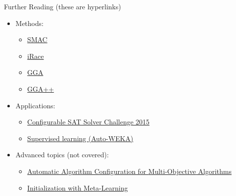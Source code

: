 \begin{frame}[c,fragile]{Further Reading (these are hyperlinks)}

\begin{itemize}
    \item Methods:
    \begin{itemize}
        \item \href{http://aad.informatik.uni-freiburg.de/papers/11-LION5-SMAC.pdf}{\alert{SMAC}}
        \item \href{http://www.sciencedirect.com/science/article/pii/S2214716015300270}{\alert{iRace}}
        \item \href{http://link.springer.com/content/pdf/10.1007/978-3-642-04244-7_14.pdf}{\alert{GGA}}
        \item \href{https://pdfs.semanticscholar.org/a6ca/d9660a0543c7a4c3ba93cd357ac97033da94.pdf}{\alert{GGA++}}
	\end{itemize}
	
	\item Applications:
	\begin{itemize}
	  \item \href{http://arxiv.org/pdf/1505.01221v1}{\alert{Configurable SAT Solver Challenge 2015}} 
	  \item \href{http://www.cs.ubc.ca/labs/beta/Projects/autoweka/papers/autoweka.pdf}{Supervised learning (\alert{Auto-WEKA})}
	\end{itemize}

	\item Advanced topics (not covered):
	\begin{itemize}
	  \item \href{https://hal.archives-ouvertes.fr/hal-01370392/document}{Automatic Algorithm Configuration for \alert{Multi-Objective} Algorithms}
	  \item \href{https://www.aaai.org/ocs/index.php/AAAI/AAAI18/paper/download/17235/15829}{Initialization with \alert{Meta-Learning}}
	\end{itemize}
\end{itemize}

\end{frame}

